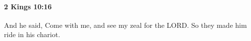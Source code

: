 
		\paragraph{2 Kings 10:16} %
			\label{2KINGS-10-16}

			And he said, Come with me, and see my zeal for the LORD. So they made him ride in his chariot.


